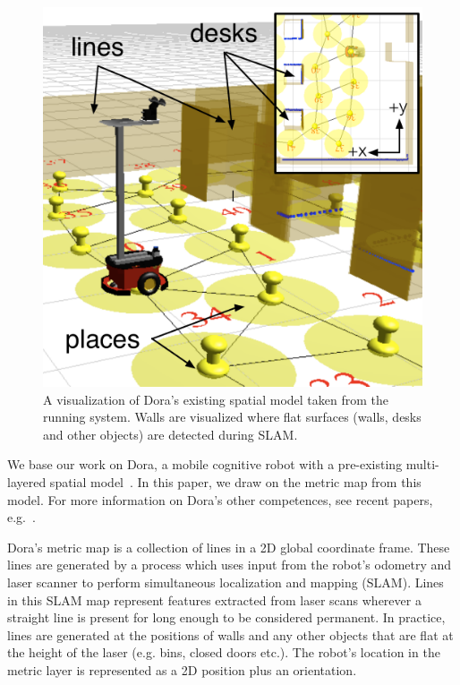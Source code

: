 \documentclass[letterpaper]{article}
\begin{document}
\begin{figure}[t!]
  \includegraphics[width=\columnwidth]{images/classroom-peekabot-annotated.pdf}
  \caption{A visualization of Dora's existing spatial model taken from the running system. Walls are visualized where flat surfaces (walls, desks and other objects) are detected during SLAM.}
  \label{fig:dora-spatial}
\end{figure}

We base our work on Dora, a mobile cognitive robot with a pre-existing multi-layered spatial model~\cite{Hawes/etal:2011}. In this paper, we draw on the metric map from this model. For more information on Dora's other competences, see recent papers, e.g.~\cite{Hawes/etal:2011,Hanheide/etal:2011}.

Dora's metric map is a collection of lines in a 2D global coordinate frame. These lines are generated by a process which uses input from the robot's odometry and laser scanner to perform simultaneous localization and mapping (SLAM). Lines in this SLAM map represent features extracted from laser scans wherever a straight line is present for long enough to be considered permanent. In practice, lines are generated at the positions of walls and any other objects that are flat at the height of the laser (e.g. bins, closed doors etc.). The robot's location in the metric layer is represented as a 2D position plus an orientation. 
\end{document}
